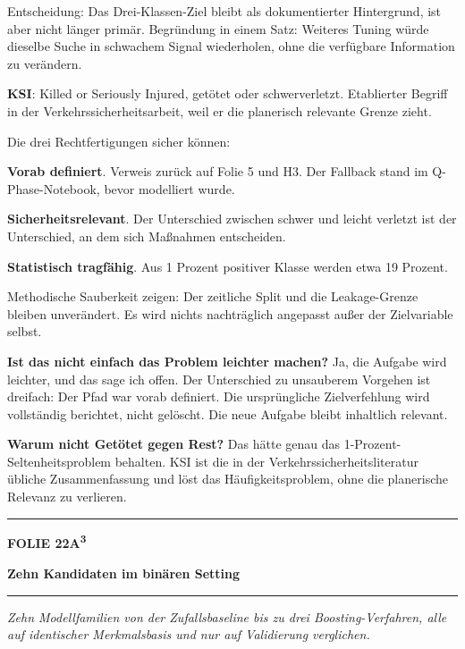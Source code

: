 \documentclass[9pt]{extarticle}
\newcommand{\karte}[3]{%
  \clearpage
  {\color{Accent}\rule{\linewidth}{2.4pt}}\par\vspace{2.5pt}
  {\fontsize{8}{9}\selectfont\bfseries\color{Accent}%
   FOLIE #1\hspace{1.2em}\textbar\hspace{1.2em}#2}\par\vspace{1pt}
  {\fontsize{16}{18}\selectfont\bfseries\color{AccentDark}#3}\par\vspace{3pt}
  {\color{Accent!45}\rule{\linewidth}{0.5pt}}\par\vspace{4pt}%
}
\newcommand{\rubrik}[1]{%
  \vspace{3.5pt}{\fontsize{7.5}{8.5}\selectfont\bfseries\color{Grau}%
  \MakeUppercase{#1}}\par\vspace{1.5pt}}
\newcommand{\kernsatz}[1]{%
  \begin{tcolorbox}[enhanced,sharp corners,boxrule=0pt,
    leftrule=2.2pt,colframe=Accent,colback=AccentPale,
    left=5pt,right=5pt,top=3.5pt,bottom=3.5pt,before skip=1pt,after skip=2pt]
    \color{AccentDark}\itshape #1
  \end{tcolorbox}}
\newcommand{\frage}[2]{\item \textbf{\color{AccentDark}#1} #2}
\begin{document}
\rubrik{Sagen}
\begin{sag}
  \item Entscheidung: Das Drei-Klassen-Ziel bleibt als dokumentierter Hintergrund, ist aber nicht
        länger primär. Begründung in einem Satz: Weiteres Tuning würde dieselbe Suche in
        schwachem Signal wiederholen, ohne die verfügbare Information zu verändern.
  \item \textbf{KSI}: Killed or Seriously Injured, getötet oder schwerverletzt. Etablierter
        Begriff in der Verkehrssicherheitsarbeit, weil er die planerisch relevante Grenze zieht.
  \item Die drei Rechtfertigungen sicher können:
  \begin{sag}
    \item \textbf{Vorab definiert}. Verweis zurück auf Folie 5 und H3. Der Fallback stand im
          Q-Phase-Notebook, bevor modelliert wurde.
    \item \textbf{Sicherheitsrelevant}. Der Unterschied zwischen schwer und leicht verletzt ist
          der Unterschied, an dem sich Maßnahmen entscheiden.
    \item \textbf{Statistisch tragfähig}. Aus 1 Prozent positiver Klasse werden etwa 19 Prozent.
  \end{sag}
  \item Methodische Sauberkeit zeigen: Der zeitliche Split und die Leakage-Grenze bleiben
        unverändert. Es wird nichts nachträglich angepasst außer der Zielvariable selbst.
\end{sag}

\rubrik{Wenn gefragt}
\begin{begriff}
  \frage{Ist das nicht einfach das Problem leichter machen?}{Ja, die Aufgabe wird leichter, und
    das sage ich offen. Der Unterschied zu unsauberem Vorgehen ist dreifach: Der Pfad war vorab
    definiert. Die ursprüngliche Zielverfehlung wird vollständig berichtet, nicht gelöscht.
    Die neue Aufgabe bleibt inhaltlich relevant.}
  \frage{Warum nicht Getötet gegen Rest?}{Das hätte genau das 1-Prozent-Seltenheitsproblem
    behalten. KSI ist die in der Verkehrssicherheitsliteratur übliche Zusammenfassung und löst
    das Häufigkeitsproblem, ohne die planerische Relevanz zu verlieren.}
\end{begriff}

\karte{22}{A\textsuperscript{3}}{Zehn Kandidaten im binären Setting}

\kernsatz{Zehn Modellfamilien von der Zufallsbaseline bis zu drei Boosting-Verfahren, alle auf
identischer Merkmalsbasis und nur auf Validierung verglichen.}
\end{document}
